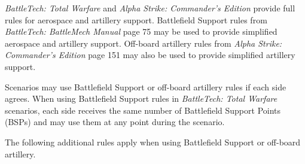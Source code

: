 \emph{BattleTech: Total Warfare} and \emph{Alpha Strike: Commander's Edition} provide full rules for aerospace and artillery support.
Battlefield Support rules from \emph{BattleTech: BattleMech Manual} page 75 may be used to provide simplified aerospace and artillery support.
Off-board artillery rules from \emph{Alpha Strike: Commander's Edition} page 151 may also be used to provide simplified artillery support.

Scenarios may use Battlefield Support or off-board artillery rules if each side agrees.
When using Battlefield Support rules in \emph{BattleTech: Total Warfare} scenarios, each side receives the same number of Battlefield Support Points (BSPs) and may use them at any point during the scenario.

The following additional rules apply when using Battlefield Support or off-board artillery.

